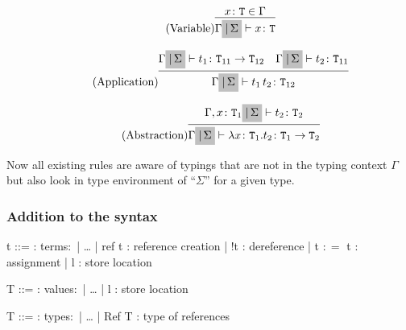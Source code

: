 \begin{equation*}
    \tag{Variable}
    \infer{
        \Gamma \colorbox{lightgray}{$|\,\Sigma$} \vdash x \colon \texttt{T}
    }{
        x \colon \texttt{T} \in \Gamma
    }
\end{equation*}

\begin{equation*}
    \tag{Application}
    \infer{
        \Gamma \colorbox{lightgray}{$|\,\Sigma$} \vdash t_1\,t_2 \colon \texttt{T}_{12}
    }{
        \Gamma \colorbox{lightgray}{$|\,\Sigma$} \vdash t_1 \colon \texttt{T}_{11} \rightarrow \texttt{T}_{12}
        &
        \Gamma \colorbox{lightgray}{$|\,\Sigma$} \vdash t_2 \colon \texttt{T}_{11}
    }
\end{equation*}

\begin{equation*}
    \tag{Abstraction}
    \infer{
        \Gamma \colorbox{lightgray}{$|\,\Sigma$} \vdash \lambda x \colon \texttt{T}_1 . t_2 \colon \texttt{T}_1 \rightarrow \texttt{T}_2
    }{
        \Gamma,x \colon \texttt{T}_1 \colorbox{lightgray}{$|\,\Sigma$} \vdash t_2 \colon \texttt{T}_2
    }
\end{equation*}

Now all existing rules are aware of typings that are not in the typing context
$\Gamma$ but also look in type environment of ``$\Sigma$'' for a given type.

\subsubsection{Addition to the syntax \cite{pierce2002ProgLang}}
\begin{bnfgrammar}
    t ::= : terms$\colon$
    | \dots
    | ref t : reference creation
    | !t : dereference
    | t $\colon=$ t : assignment
    | l : store location
\end{bnfgrammar}\leavevmode\newline

\begin{bnfgrammar}
    T ::= : values$\colon$
    | \dots
    | l : store location
\end{bnfgrammar}\leavevmode\newline

\begin{bnfgrammar}
    T ::= : types$\colon$
    | \dots
    | Ref T : type of references
\end{bnfgrammar}\leavevmode\newline

